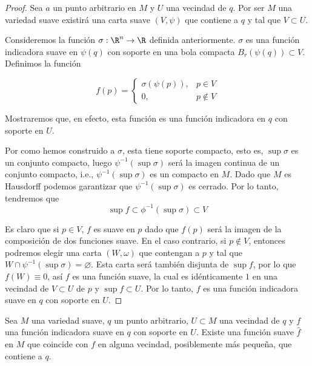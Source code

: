\begin{proof}
	Sea $a$ un punto arbitrario en $M$ y $U$ una vecindad de $q$. Por ser $M$ una variedad suave existirá una carta suave $(V,\psi)$ que contiene a $q$ y tal que $V \subset U$.

	Consideremos la función $\sigma: \R^n \to \R$ definida anteriormente. $\sigma$ es una función indicadora suave en $\psi(q)$ con soporte en una bola compacta $B_r(\psi(q)) \subset V$. Definimos la función

	\[
		f(p) = \begin{cases}
			\sigma(\psi(p)), & p \in V    \\
			0,               & p \notin V
		\end{cases}
	\]

	Mostraremos que, en efecto, esta función es una función indicadora en $q$ con soporte en $U$.

	Por como hemos construido a $\sigma$, esta tiene soporte compacto, esto es, $\sup \sigma$ es un conjunto compacto, luego $\psi^{-1}(\sup \sigma)$ será la imagen continua de un conjunto compacto, i.e., $\psi^{-1}(\sup \sigma)$ es un compacto en $M$. Dado que $M$ es Hausdorff podemos garantizar que $\psi^{-1} (\sup \sigma)$ es cerrado. Por lo tanto, tendremos que
	\[
		\sup f \subset \phi^{-1} (\sup \sigma) \subset V
	\]

	Es claro que si $p \in V$, $f$ es suave en $p$ dado que $f(p)$ será la imagen de la composición de dos funciones suave. En el caso contrario, si $p \notin V$, entonces podremos elegir una carta $(W,\omega)$ que contengan a $p$ y tal que $W \cap \psi^{-1}(\sup \sigma) = \varnothing$. Esta carta será también disjunta de $\sup f$, por lo que $f(W) \equiv 0$, así $f$ es una función suave, la cual es idénticamente $1$ en una vecindad de $V \subset U$ de $p$ y $\sup f \subset U$. Por lo tanto, $f$ es una función indicadora suave en $q$ con soporte en $U$.
\end{proof}

\begin{lemma}
	Sea $M$ una variedad suave, $q$ un punto arbitrario, $U \subset M$ una vecindad de $q$ y $f$ una función indicadora suave en $q$ con soporte en $U$. Existe una función suave $\hat{f}$ en $M$ que coincide con $f$ en alguna vecindad, posiblemente más pequeña, que contiene a $q$.
\end{lemma}

